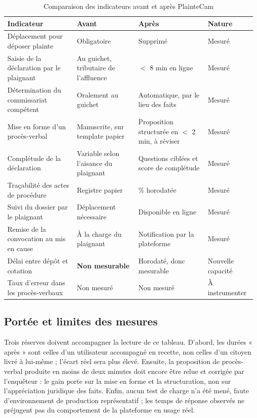 \begin{table}[H]
    \centering
    \begin{tabularx}{\textwidth}{|>{\raggedright\arraybackslash}X|>{\raggedright\arraybackslash}p{2.4cm}|>{\raggedright\arraybackslash}p{2.9cm}|>{\raggedright\arraybackslash}p{2.2cm}|}
        \hline
        \textbf{Indicateur} & \textbf{Avant} & \textbf{Après} & \textbf{Nature} \\
        \hline
        Déplacement pour déposer plainte & Obligatoire & Supprimé & Mesuré \\
        \hline
        Saisie de la déclaration par le plaignant & Au guichet, tributaire de l'affluence & $<$ 8 min en ligne & Mesuré \\
        \hline
        Détermination du commissariat compétent & Oralement au guichet & Automatique, par le lieu des faits & Mesuré \\
        \hline
        Mise en forme d'un procès-verbal & Manuscrite, sur template papier & Proposition structurée en $<$ 2 min, à réviser & Mesuré \\
        \hline
        Complétude de la déclaration & Variable selon l'aisance du plaignant & Questions ciblées et score de complétude & Mesuré \\
        \hline
        Traçabilité des actes de procédure & Registre papier & 100\% horodatée & Mesuré \\
        \hline
        Suivi du dossier par le plaignant & Déplacement nécessaire & Disponible en ligne & Mesuré \\
        \hline
        Remise de la convocation au mis en cause & À la charge du plaignant & Notification par la plateforme & Mesuré \\
        \hline
        Délai entre dépôt et cotation & \textbf{Non mesurable} & Horodaté, donc mesurable & Nouvelle capacité \\
        \hline
        Taux d'erreur dans les procès-verbaux & Non mesuré & Non mesuré & À instrumenter \\
        \hline
    \end{tabularx}
    \caption{Comparaison des indicateurs avant et après PlainteCam}
    \label{tab:resultats}
\end{table}

\subsection{Portée et limites des mesures}

Trois réserves doivent accompagner la lecture de ce tableau. D'abord, les durées « après » sont celles d'un utilisateur accompagné en recette, non celles d'un citoyen livré à lui-même ; l'écart réel sera plus élevé. Ensuite, la proposition de procès-verbal produite en moins de deux minutes doit encore être relue et corrigée par l'enquêteur : le gain porte sur la mise en forme et la structuration, non sur l'appréciation juridique des faits. Enfin, aucun test de charge n'a été mené, faute d'environnement de production représentatif ; les temps de réponse observés ne préjugent pas du comportement de la plateforme en usage réel.

